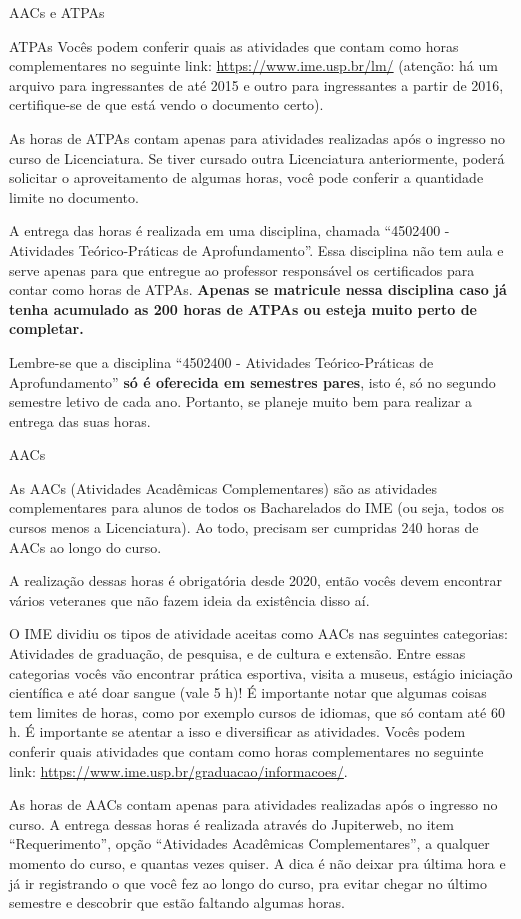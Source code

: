 \begin{secao}{AACs e ATPAs}
\begin{subsecao}{ATPAs}
Vocês podem conferir quais as atividades que contam como horas complementares
no seguinte link: \url{https://www.ime.usp.br/lm/} (atenção: há um arquivo para
ingressantes de até 2015 e outro para ingressantes a partir de 2016,
certifique-se de que está vendo o documento certo).

As horas de ATPAs contam apenas para atividades realizadas após o ingresso no
curso de Licenciatura. Se tiver cursado outra Licenciatura anteriormente, poderá
solicitar o aproveitamento de algumas horas, você pode conferir a quantidade
limite no documento.

A entrega das horas é realizada em uma disciplina, chamada
``4502400 - Atividades Teórico-Práticas de Aprofundamento''. Essa disciplina não
tem aula e serve apenas para que entregue ao professor responsável os certificados
para contar como horas de ATPAs. \textbf{Apenas se matricule nessa disciplina caso já}
\textbf{tenha acumulado as 200 horas de ATPAs ou esteja muito perto de completar.}

Lembre-se que a disciplina ``4502400 - Atividades Teórico-Práticas de Aprofundamento''
\textbf{só é oferecida em semestres pares}, isto é, só no segundo semestre letivo de cada ano.
Portanto, se planeje muito bem para realizar a entrega das suas horas.

\end{subsecao}

\begin{subsecao}{AACs}

As AACs (Atividades Acadêmicas Complementares) são as atividades complementares
para alunos de todos os Bacharelados do IME (ou seja, todos os cursos menos a
Licenciatura). Ao todo, precisam ser cumpridas 240 horas de AACs ao longo do curso.

A realização dessas horas é obrigatória desde 2020, então vocês devem encontrar
vários veteranes que não fazem ideia da existência disso aí.

O IME dividiu os tipos de atividade aceitas como AACs nas seguintes categorias:
Atividades de graduação, de pesquisa, e de cultura e extensão. Entre essas categorias
vocês vão encontrar prática esportiva, visita a museus, estágio iniciação científica 
e até doar sangue (vale 5 h)!
É importante notar que algumas coisas tem limites de horas, como por exemplo
cursos de idiomas, que só contam até 60 h. É importante se atentar a isso e
diversificar as atividades.
Vocês podem conferir quais atividades que contam como horas complementares
no seguinte link: \url{https://www.ime.usp.br/graduacao/informacoes/}.

As horas de AACs contam apenas para atividades realizadas após o ingresso no curso.
A entrega dessas horas é realizada através do Jupiterweb, no item ``Requerimento'',
opção ``Atividades Acadêmicas Complementares'', a qualquer momento do curso, e
quantas vezes quiser. A dica é não deixar pra última hora e já ir registrando o que
você fez ao longo do curso, pra evitar chegar no último semestre e descobrir que estão
faltando algumas horas.

\end{subsecao}

\end{secao}

